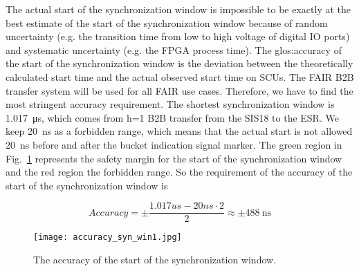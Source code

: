 The actual start of the synchronization window is impossible to be exactly at the best estimate of the start of the synchronization window because of random uncertainty (e.g. the transition time from low to high voltage of digital IO ports) and systematic uncertainty (e.g. the FPGA process time). The \gls{glos:accuracy} of the start of the synchronization window is the deviation between the theoretically calculated start time and the actual observed start time on SCUs. The FAIR B2B transfer system will be used for all FAIR use cases. Therefore, we have to find the most stringent accuracy requirement. The shortest synchronization window is \SI{1.017}{\us}, which comes from h=1 B2B transfer from the SIS18 to the ESR. We keep \SI{20}{ns} as a forbidden range, which means that the actual start is not allowed \SI{20}{\ns} before and after the bucket indication signal marker. The green region in Fig.~\ref{accuracy_syn_win1} represents the safety margin for the start of the synchronization window and the red region the forbidden range. So the requirement of the accuracy of the start of the synchronization window is 

\begin{equation}
Accuracy=\pm\frac{1.017us-20ns \cdot 2}{2}\approx \pm \SI{488}{\ns}\label{accu}
\end{equation}

\begin{figure}[!htb]
   \centering   
   \texttt{[image: accuracy\_syn\_win1.jpg]}
   \caption{The accuracy of the start of the synchronization window.}
   \label{accuracy_syn_win1}
\end{figure}




